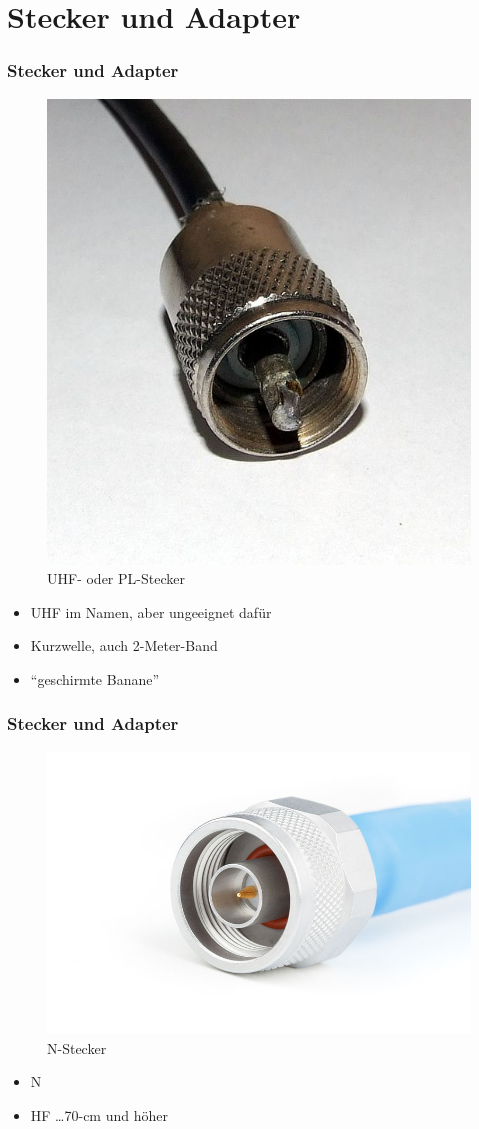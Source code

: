 \section*{Stecker und Adapter}
\begin{frame}
\frametitle{Stecker und Adapter}
\begin{center}
  \begin{figure}
	\includegraphics[width=.6\textwidth,height=.6\textheight,keepaspectratio]{e10/pl.jpg}
	\caption{UHF- oder PL-Stecker\cite{pl}}
      \end{figure}
	\begin{itemize}
		\item UHF im Namen, aber ungeeignet dafür
		\item Kurzwelle, auch 2-Meter-Band
        \item ``geschirmte Banane''
	\end{itemize}
\end{center}
\end{frame}

\begin{frame}
\frametitle{Stecker und Adapter}
\begin{center}
  \begin{figure}
	\includegraphics[width=.6\textwidth,height=.6\textheight,keepaspectratio]{e10/n.jpg}
	\caption{N-Stecker\cite{n}}
      \end{figure}
	\begin{itemize}
		\item N
		\item HF \dots 70-cm und höher
	\end{itemize}	 
\end{center}
\end{frame}

